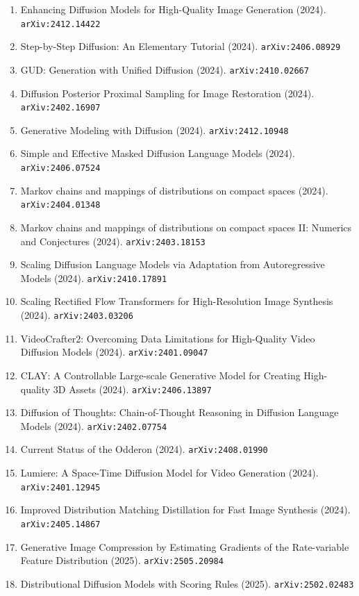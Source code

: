 \documentclass[11pt]{article}
\begin{document}
\begin{enumerate}
  \item Enhancing Diffusion Models for High-Quality Image Generation (2024). \texttt{arXiv:2412.14422}
  \item Step-by-Step Diffusion: An Elementary Tutorial (2024). \texttt{arXiv:2406.08929}
  \item GUD: Generation with Unified Diffusion (2024). \texttt{arXiv:2410.02667}
  \item Diffusion Posterior Proximal Sampling for Image Restoration (2024). \texttt{arXiv:2402.16907}
  \item Generative Modeling with Diffusion (2024). \texttt{arXiv:2412.10948}
  \item Simple and Effective Masked Diffusion Language Models (2024). \texttt{arXiv:2406.07524}
  \item Markov chains and mappings of distributions on compact spaces (2024). \texttt{arXiv:2404.01348}
  \item Markov chains and mappings of distributions on compact spaces II:
  Numerics and Conjectures (2024). \texttt{arXiv:2403.18153}
  \item Scaling Diffusion Language Models via Adaptation from Autoregressive Models (2024). \texttt{arXiv:2410.17891}
  \item Scaling Rectified Flow Transformers for High-Resolution Image Synthesis (2024). \texttt{arXiv:2403.03206}
  \item VideoCrafter2: Overcoming Data Limitations for High-Quality Video
  Diffusion Models (2024). \texttt{arXiv:2401.09047}
  \item CLAY: A Controllable Large-scale Generative Model for Creating
  High-quality 3D Assets (2024). \texttt{arXiv:2406.13897}
  \item Diffusion of Thoughts: Chain-of-Thought Reasoning in Diffusion Language
  Models (2024). \texttt{arXiv:2402.07754}
  \item Current Status of the Odderon (2024). \texttt{arXiv:2408.01990}
  \item Lumiere: A Space-Time Diffusion Model for Video Generation (2024). \texttt{arXiv:2401.12945}
  \item Improved Distribution Matching Distillation for Fast Image Synthesis (2024). \texttt{arXiv:2405.14867}
  \item Generative Image Compression by Estimating Gradients of the Rate-variable Feature Distribution (2025). \texttt{arXiv:2505.20984}
  \item Distributional Diffusion Models with Scoring Rules (2025). \texttt{arXiv:2502.02483}

\end{enumerate}
\end{document}
